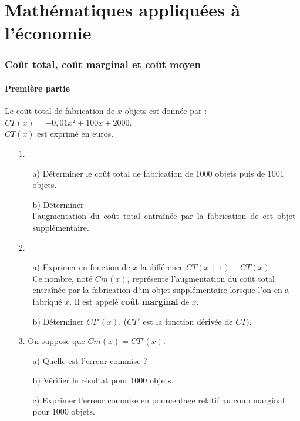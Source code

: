 \setcounter{section}{0} 

\part{Mathématiques appliquées à l'économie}

\section{Coût total, coût marginal et coût moyen}

\subsection{Première partie}

Le coût total de fabrication de $x$ objets est donnée par : $CT(x) = -0,01x^2 + 100x + 2000$. \\
$CT(x)$ est exprimé en euros. \\

\begin{itemize}
\item[1.] 
\begin{itemize}
\item[a)] Déterminer le coût total de fabrication de 1000 objets puis de 1001 objets. 
\item[b)] Déterminer \hbox{l'augmentation du coût total entraînée par la fabrication de cet objet supplémentaire.}
\end{itemize}
\item[2.]
\begin{itemize}
\item[a)] Exprimer en fonction de $x$ la différence $CT(x+1) - CT(x)$. \\ Ce nombre, noté $Cm(x)$, représente l'augmentation du coût total entraînée par la fabrication d'un objet supplémentaire lorsque l'on en a fabriqué $x$. Il est appelé \textbf{coût marginal} de $x$.
\item[b)] Déterminer $CT'(x)$. ($CT'$ est la fonction dérivée de $CT$). 
\end{itemize}
\item[3.] On suppose que $Cm(x) = CT'(x)$. 
\begin{itemize}
\item[a)] Quelle est l'erreur commise ?
\item[b)] Vérifier le résultat pour 1000 objets. 
\item[c)] Exprimer l'erreur commise en pourcentage relatif au coup marginal pour 1000 objets.
\end{itemize}
\end{itemize}

